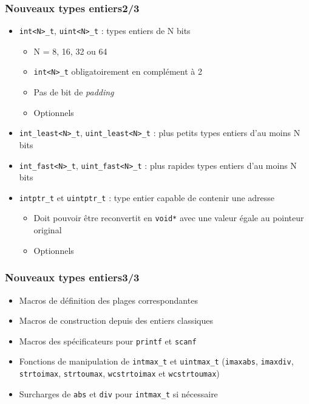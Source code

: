 \documentclass[C++.tex]{subfiles}
\begin{document}
\begin{frame}[fragile]
	\frametitle{Nouveaux types entiers\titlehfill{}2/3}
	\begin{itemize}
		\item \lstinline|int<N>_t|, \lstinline|uint<N>_t| : types entiers de N bits
		\begin{itemize}
			\item N = 8, 16, 32 ou 64
			\item \lstinline|int<N>_t| obligatoirement en complément à 2


			\item Pas de bit de \textit{padding}
			\item Optionnels
		\end{itemize}
		\item \lstinline|int_least<N>_t|, \lstinline|uint_least<N>_t| : plus petits types entiers d'au moins N bits
		\item \lstinline|int_fast<N>_t|, \lstinline|uint_fast<N>_t| : plus rapides types entiers d'au moins N bits
		\item \lstinline|intptr_t| et \lstinline|uintptr_t| : type entier capable de contenir une adresse
		\begin{itemize}
			\item Doit pouvoir être reconvertit en \lstinline|void*| avec une valeur égale au pointeur original
			\item Optionnels
		\end{itemize}
	\end{itemize}
\end{frame}

\begin{frame}[fragile]
	\frametitle{Nouveaux types entiers\titlehfill{}3/3}
	\begin{itemize}
		\item Macros de définition des plages correspondantes
		\item Macros de construction depuis des entiers \og classiques\fg{}
		\item Macros des spécificateurs pour \lstinline|printf| et \lstinline|scanf|
		\item Fonctions de manipulation de \lstinline|intmax_t| et \lstinline|uintmax_t| (\lstinline|imaxabs|, \lstinline|imaxdiv|, \lstinline|strtoimax|, \lstinline|strtoumax|, \lstinline|wcstrtoimax| et \lstinline|wcstrtoumax|)
		\item Surcharges de \lstinline|abs| et \lstinline|div| pour \lstinline|intmax_t| si nécessaire
	\end{itemize}
\end{frame}
\end{document}
